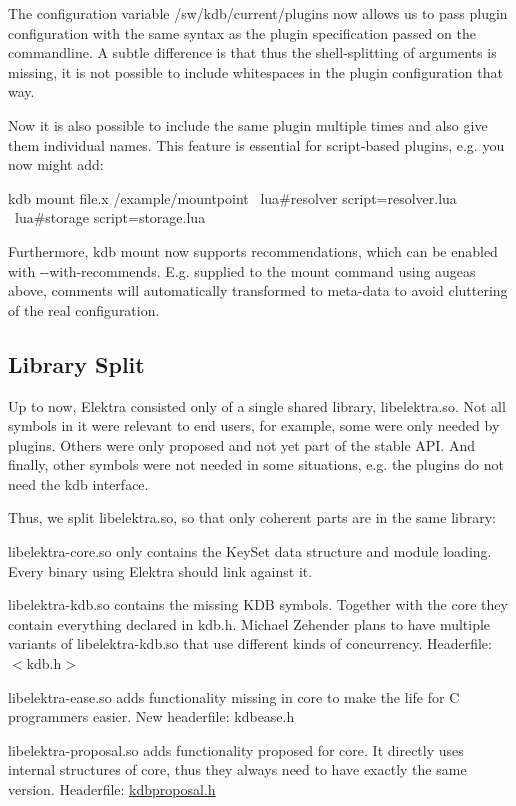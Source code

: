 The configuration variable {\ttfamily /sw/kdb/current/plugins} now allows us to pass plugin configuration with the same syntax as the plugin specification passed on the commandline. A subtle difference is that thus the shell-\/splitting of arguments is missing, it is not possible to include whitespaces in the plugin configuration that way.

Now it is also possible to include the same plugin multiple times and also give them individual names. This feature is essential for script-\/based plugins, e.\+g. you now might add\+: \begin{DoxyVerb}    kdb mount file.x /example/mountpoint \
            lua#resolver script=resolver.lua \
            lua#storage script=storage.lua
\end{DoxyVerb}


Furthermore, {\ttfamily kdb mount} now supports recommendations, which can be enabled with {\ttfamily -\/-\/with-\/recommends}. E.\+g. supplied to the mount command using augeas above, comments will automatically transformed to meta-\/data to avoid cluttering of the real configuration.

\subsection*{Library Split}

Up to now, Elektra consisted only of a single shared library, {\ttfamily libelektra.\+so}. Not all symbols in it were relevant to end users, for example, some were only needed by plugins. Others were only proposed and not yet part of the stable A\+P\+I. And finally, other symbols were not needed in some situations, e.\+g. the plugins do not need the {\ttfamily kdb} interface.

Thus, we split {\ttfamily libelektra.\+so}, so that only coherent parts are in the same library\+:


\begin{DoxyItemize}
\item {\ttfamily libelektra-\/core.\+so} only contains the {\ttfamily Key\+Set} data structure and module loading. Every binary using Elektra should link against it.
\item {\ttfamily libelektra-\/kdb.\+so} contains the missing {\ttfamily K\+D\+B} symbols. Together with the {\ttfamily core} they contain everything declared in {\ttfamily kdb.\+h}. Michael Zehender plans to have multiple variants of {\ttfamily libelektra-\/kdb.\+so} that use different kinds of concurrency. Headerfile\+: {\ttfamily $<$kdb.\+h$>$}
\item {\ttfamily libelektra-\/ease.\+so} adds functionality missing in {\ttfamily core} to make the life for C programmers easier. New headerfile\+: {\ttfamily kdbease.\+h}
\item {\ttfamily libelektra-\/proposal.\+so} adds functionality proposed for {\ttfamily core}. It directly uses internal structures of {\ttfamily core}, thus they always need to have exactly the same version. Headerfile\+: {\ttfamily \hyperlink{kdbproposal_8h}{kdbproposal.\+h}}
\end{DoxyItemize}

